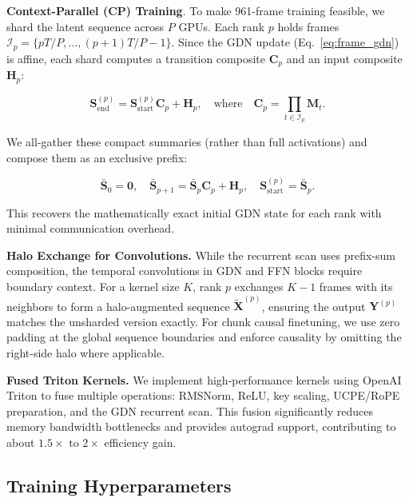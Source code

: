 \documentclass{llmxive}
\begin{document}
\noindent \textbf{Context-Parallel (CP) Training}.
To make 961-frame training feasible, we shard the latent sequence across $P$ GPUs. Each rank $p$ holds frames $\mathcal{I}_p=\{pT/P,\ldots,(p{+}1)T/P{-}1\}$. Since the GDN update (Eq.~\ref{eq:frame_gdn}) is affine, each shard computes a transition composite $\mathbf{C}_p$ and an input composite $\mathbf{H}_p$:

\begin{equation}
\mathbf{S}_{\mathrm{end}}^{(p)}=\mathbf{S}_{\mathrm{start}}^{(p)}\mathbf{C}_p+\mathbf{H}_p,
\quad
\text{where}
\quad
\mathbf{C}_p=\prod_{t\in\mathcal{I}_p}\mathbf{M}_t .
\end{equation}

\noindent We all-gather these compact summaries (rather than full activations) and compose them as an exclusive prefix:

\begin{equation}
\bar{\mathbf{S}}_0=\mathbf{0},
\quad
\bar{\mathbf{S}}_{p+1}=\bar{\mathbf{S}}_p\mathbf{C}_p+\mathbf{H}_p,
\quad
\mathbf{S}_{\mathrm{start}}^{(p)}=\bar{\mathbf{S}}_p.
\end{equation}

\noindent This recovers the mathematically exact initial GDN state for each rank with minimal communication overhead.

\noindent \textbf{Halo Exchange for Convolutions.}
While the recurrent scan uses prefix-sum composition, the temporal convolutions in GDN and FFN blocks require boundary context. For a kernel size $K$, rank $p$ exchanges $K-1$ frames with its neighbors to form a halo-augmented sequence $\tilde{\mathbf{X}}^{(p)}$, ensuring the output $\mathbf{Y}^{(p)}$ matches the unsharded version exactly. For chunk causal finetuning, we use zero padding at the global sequence boundaries and enforce causality by omitting the right-side halo where applicable.

\noindent \textbf{Fused Triton Kernels.} We implement high-performance kernels using OpenAI Triton to fuse multiple operations: RMSNorm, ReLU, key scaling, UCPE/RoPE preparation, and the GDN recurrent scan. This fusion significantly reduces memory bandwidth bottlenecks and provides autograd support, contributing to about $1.5\times$ to $2\times$ efficiency gain.

\subsection{Training Hyperparameters}
\label{sec:appendix_training_hyperparams}
\end{document}
